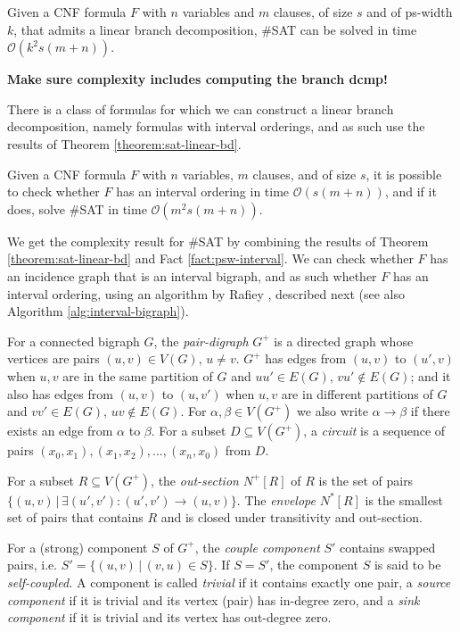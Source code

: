 \begin{theorem}
	Given a CNF formula $F$ with $n$ variables and $m$ clauses, of size $s$ and of ps-width $k$, that admits a linear branch decomposition, \#SAT can be solved in time $\mathcal{O}(k^2s(m+n))$.
	
	\textbf{Make sure complexity includes computing the branch dcmp!}
	\label{theorem:sat-linear-bd}
\end{theorem}

There is a class of formulas for which we can construct a linear branch decomposition, namely formulas with interval orderings, and as such use the results of Theorem \ref{theorem:sat-linear-bd}. 

\begin{theorem}
	Given a CNF formula $F$ with $n$ variables, $m$ clauses, and of size $s$, it is possible to check whether $F$ has an interval ordering in time $\mathcal{O}(s(m+n))$, and if it does, solve \#SAT in time $\mathcal{O}(m^2s(m+n))$.
\end{theorem}

\noindent
We get the complexity result for \#SAT by combining the results of Theorem \ref{theorem:sat-linear-bd} and Fact \ref{fact:psw-interval}.
We can check whether $F$ has an incidence graph that is an interval bigraph, and as such whether $F$ has an interval ordering, using an algorithm by Rafiey \cite{DBLP:journals/corr/abs-1211-2662}, described next (see also Algorithm \ref{alg:interval-bigraph}).

For a connected bigraph $G$, the {\em pair-digraph} $G^+$ is a directed graph whose vertices are pairs $(u,v) \in V(G),\, u \neq v$.
$G^+$ has edges from $(u,v)$ to $(u',v)$ when $u,v$ are in the same partition of $G$ and $uu' \in E(G),\, vu' \not\in E(G)$; and it also has edges from $(u,v)$ to $(u,v')$ when $u,v$ are in different partitions of $G$ and $vv' \in E(G),\, uv \not\in E(G)$.
For $\alpha, \beta \in V(G^+)$ we also write $\alpha \rightarrow \beta$ if there exists an edge from $\alpha$ to $\beta$.
For a subset $D \subseteq V(G^+)$, a {\em circuit} is a sequence of pairs $(x_0, x_1), (x_1, x_2), ..., (x_n, x_0)$ from $D$.

For a subset $R \subseteq V(G^+)$, the {\em out-section} $N^+[R]$ of $R$ is the set of pairs  $\{ (u, v) \, | \, \exists (u',v') : (u',v') \rightarrow (u,v) \}$.
The {\em envelope} $N^*[R]$ is the smallest set of pairs that contains $R$ and is closed under transitivity and out-section.

For a (strong) component $S$ of $G^+$, the {\em couple component} $S'$ contains swapped pairs, i.e. $S' = \{ (u,v) \, | \, (v,u) \in S \}$.
If $S = S'$, the component $S$ is said to be {\em self-coupled.}
A component is called {\em trivial} if it contains exactly one pair, a {\em source component} if it is trivial and its vertex (pair) has in-degree zero, and a {\em sink component} if it is trivial and its vertex has out-degree zero.

